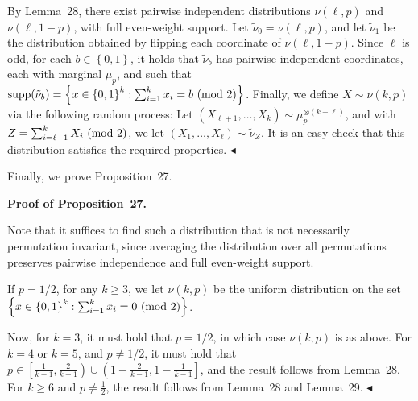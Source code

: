 By Lemma 28, there exist pairwise independent distributions $\nu(\ell,p)$ and $\nu(\ell,1-p)$, with full even-weight support.
Let $\tilde{\nu}_{0}=\nu(\ell,p)$, and let $\tilde{\nu}_{1}$ be the distribution obtained by flipping each coordinate of $\nu(\ell,1-p)$.
Since $\ell$ is odd, for each $b\in\left\{0,1\right\}$, it holds that $\tilde{\nu}_{b}$ has pairwise independent coordinates, each with marginal $\mu_{p}$, and such that $\textnormal{supp}(\tilde{\nu}_{b})=\left\{x\in\left\{0,1\right\}^{k}:\sum_{i=1}^{k}x_{i}=b\textnormal{ (mod 2)}\right\}$.
Finally, we define $X\sim\nu(k,p)$ via the following random process: Let $(X_{\ell+1},\dots,X_{k})\sim\mu_{p}^{\otimes\left(k-\ell\right)}$, and with $Z=\sum_{i=\ell+1}^{k}X_{i}\textnormal{ (mod 2)}$, we let $(X_{1},\dots,X_{\ell})\sim\tilde{\nu}_{Z}$.
It is an easy check that this distribution satisfies the required properties.
$\blacktriangleleft$\par




Finally, we prove Proposition 27.\par





\par\medskip\noindent\textbf{Proof of Proposition 27.}\par




Note that it suffices to find such a distribution that is not necessarily permutation invariant, since averaging the distribution over all permutations preserves pairwise independence and full even-weight support.\par




If $p=1/2$, for any $k\geqslant 3$, we let $\nu(k,p)$ be the uniform distribution on the set $\left\{x\in\left\{0,1\right\}^{k}:\sum_{i=1}^{k}x_{i}=0\textnormal{ (mod 2)}\right\}$.\par




Now, for $k=3$, it must hold that $p=1/2$, in which case $\nu(k,p)$ is as above.
For $k=4$ or $k=5$, and $p\not=1/2$, it must hold that $p\in\left[\frac{1}{k-1},\frac{2}{k-1}\right)\cup\left(1-\frac{2}{k-1},1-\frac{1}{k-1}\right]$, and the result follows from Lemma 28.
For $k\geqslant 6$ and $p\not=\frac{1}{2}$, the result follows from Lemma 28 and Lemma 29.
$\blacktriangleleft$\par







